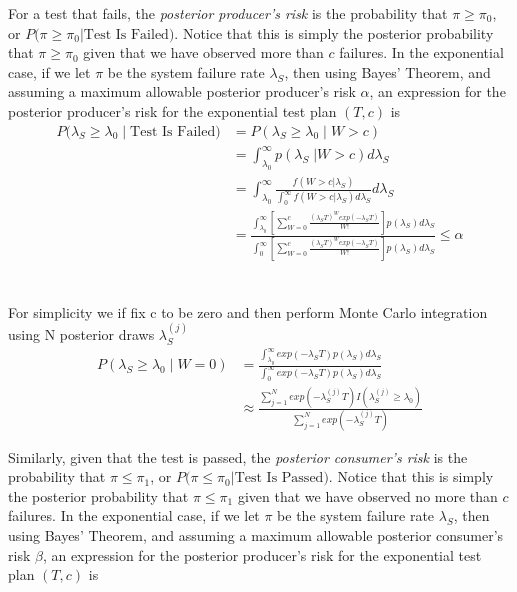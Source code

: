 \documentclass[12pt]{article}
\begin{document}
For a test that fails, the \emph{posterior producer's risk} is the probability
that $\pi \geq \pi_{0}$, or $P \text{(}\pi \ge \pi_0 \vert \text{Test Is
Failed)}$. Notice that this is simply the posterior probability that $\pi \ge
\pi_0$ given that we have observed more than $c$ failures. In the exponential
case, if we let $\pi$ be the system failure rate $\lambda_S$, then using Bayes'
Theorem, and assuming a maximum allowable posterior producer's risk $\alpha$, an
expression for the posterior producer's risk for the exponential test plan
$(T,c)$ is
$$
\begin{aligned}
    P(\lambda_S \geq \lambda_0 \; \vert \; \text{Test Is Failed)} &= P(\lambda_S
    \geq \lambda_0 \; \vert \; W > c) \\ &= \int_{\lambda_0}^{\infty}
    p(\lambda_S \; \vert W > c) d\lambda_S \\ &= \int_{\lambda_0}^{\infty}
    \frac{f(W > c \vert \lambda_S)}{\int_{0}^{\infty} f(W > c \vert \lambda_S)
    d\lambda_S} d\lambda_S \\ &= \frac{\int_{\lambda_0}^{\infty} [ \sum_{W=0}^c
    \frac{(\lambda_S T)^W exp(-\lambda_S T)}{W!}]p(\lambda_S)d\lambda_S}
    {\int_{0}^{\infty} [ \sum_{W=0}^c \frac{(\lambda_S T)^W exp(-\lambda_S
    T)}{W!}]p(\lambda_S)d\lambda_S} \leq \alpha
\end{aligned}
$$
\\
\\
For simplicity we if fix c to be zero and then perform Monte Carlo integration
using N posterior draws $ \lambda_S^{(j)} $
$$
\begin{aligned}
	 P(\lambda_S \geq \lambda_0 \; \vert \; W = 0) &=
	 \frac{\int_{\lambda_0}^{\infty} exp(-\lambda_S T)p(\lambda_S)d\lambda_S}
	 {\int_{0}^{\infty} exp(-\lambda_S T)p(\lambda_S)d\lambda_S} \\ &\approx
	 \frac{\sum_{j = 1}^{N} exp(-\lambda_S^{(j)} T)I(\lambda_S^{(j)} \geq
	 \lambda_0)} {\sum_{j = 1}^{N} exp(-\lambda_S^{(j)} T)} \end{aligned}
$$

Similarly, given that the test is passed, the \emph{posterior consumer's risk}
is the probability that $\pi \leq \pi_1$, or $P \text{(}\pi \leq \pi_0 \vert
\text{Test Is Passed)}$. Notice that this is simply the posterior probability
that $\pi \leq \pi_1$ given that we have observed no more than $c$ failures. In
the exponential case, if we let $\pi$ be the system failure rate $\lambda_S$,
then using Bayes' Theorem, and assuming a maximum allowable posterior consumer's
risk $\beta$, an expression for the posterior producer's risk for the
exponential test plan $(T,c)$ is
\end{document}
